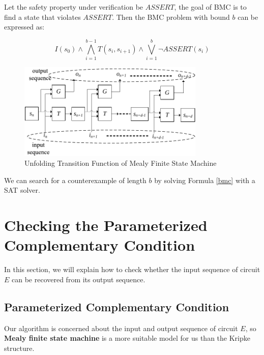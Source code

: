 \documentclass[journal]{IEEEtran}
\begin{document}
Let the safety property under verification be $ASSERT$,
the goal of BMC is to find a state that violates $ASSERT$.
Then the BMC problem with bound $b$ can be expressed as:

\begin{equation}\label{bmc}
I(s_0)\wedge \bigwedge_{i=1}^{b-1} T(s_i,s_{i+1})\wedge \bigvee_{i=1}^{b}\neg ASSERT(s_i)
\end{equation}

\begin{figure}[t]
\centering
\includegraphics[width=3.5in]{mealy}
\caption{Unfolding Transition Function of Mealy Finite State Machine}
\label{mealyfsm_unfolding}
\end{figure}


We can search for a counterexample of length $b$ by solving Formula \ref{bmc} with a SAT solver.

\section{Checking the Parameterized Complementary Condition}\label{sec_checkUA}

In this section,
we will explain how to check whether the input sequence of circuit $E$ can be recovered from its output sequence.

\subsection{Parameterized Complementary Condition}\label{subsec_pcc}

Our algorithm is concerned about the input and output sequence of circuit $E$,
so \textbf{Mealy finite state machine}\cite{MEALY} is a more suitable model for us than the Kripke structure.

\vspace{0.2cm}
\end{document}
